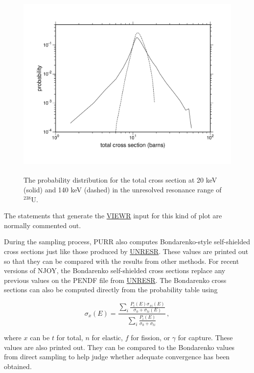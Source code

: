 \begin{figure}[thb]\centering
\includegraphics[keepaspectratio, height=3.8in, angle=0]{figs/totpdack}
\caption[Sample total cross section probability distributions]{The
 probability distribution for the total cross section at 20 keV (solid) and
 140 keV (dashed) in the unresolved resonance range of $^{238}$U.}
\label{totpd}
\end{figure}

The statements that generate the \hyperlink{sVIEWRhy}{VIEWR}
input for this kind of
plot are normally commented out.

During the sampling process, PURR also computes Bondarenko-style
self-shielded cross sections just like those produced by
\hyperlink{sUNRESRhy}{UNRESR}.  These
values are printed out so that they
can be compared with the results from other methods.  For recent
versions of NJOY, the Bondarenko self-shielded cross sections
replace any previous values on the PENDF file from
\hyperlink{sUNRESRhy}{UNRESR}.
The Bondarenko cross sections can also be computed directly from
the probability table using

\begin{equation}
   \sigma_x(E)=\frac{\displaystyle\sum_i \frac{P_i(E)\sigma_{xi}(E)}
     {\sigma_0+\sigma_{ti}(E)}}
      {\displaystyle\sum_i \frac{P_i(E)}{\sigma_0+\sigma_{ti}}} \,,
\end{equation}

\noindent
where $x$ can be $t$ for total, $n$ for elastic, $f$ for fission, or
$\gamma$ for capture.  These values are also printed out.  They can
be compared to the Bondarenko values from direct sampling to help
judge whether adequate convergence has been obtained.

